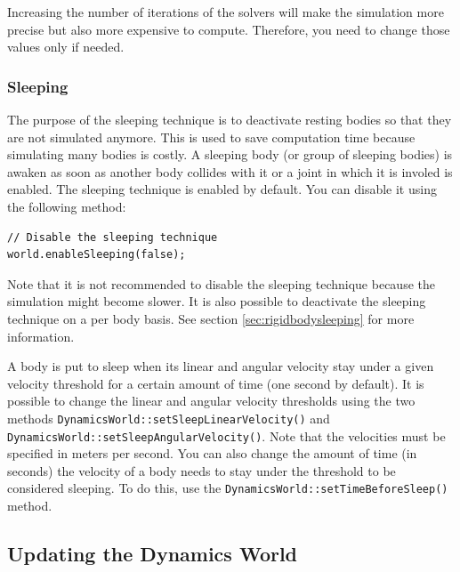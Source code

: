 \documentclass[a4paper,12pt]{article}
\begin{document}
    \vspace{0.6cm}

    Increasing the number of iterations of the solvers will make the simulation more precise but also more expensive to compute. Therefore, you need to change
    those values only if needed.

    \subsubsection{Sleeping}
    \label{sec:sleeping}

    The purpose of the sleeping technique is to deactivate resting bodies so that they are not simulated anymore. This is used to save computation time because simulating
    many bodies is costly.
    A sleeping body (or group of sleeping bodies) is awaken as soon as another body collides with it or a joint in which it is involed is enabled. The sleeping technique
    is enabled by default. You can disable it using the following method: \\

    \begin{lstlisting}
// Disable the sleeping technique
world.enableSleeping(false);
  \end{lstlisting}

    \vspace{0.6cm}

    Note that it is not recommended to disable the sleeping technique because the simulation might become slower. It is also possible to deactivate the sleeping technique on a
    per body basis. See section \ref{sec:rigidbodysleeping} for more information. \\

    \begin{sloppypar}
      A body is put to sleep when its linear and angular velocity stay under a given velocity threshold for a certain amount of time (one second by default). It is possible to
      change the linear and angular velocity thresholds using the two methods \texttt{DynamicsWorld::setSleepLinearVelocity()} and \texttt{DynamicsWorld::setSleepAngularVelocity()}.
      Note that the velocities must
      be specified in meters per second. You can also change the amount of time (in seconds) the velocity of a body needs to stay under the threshold to be considered
      sleeping. To do this, use the
    \texttt{DynamicsWorld::setTimeBeforeSleep()} method.
   \end{sloppypar}

    \subsection{Updating the Dynamics World}
    \label{sec:updatingdynamicsworld} 
\end{document}
